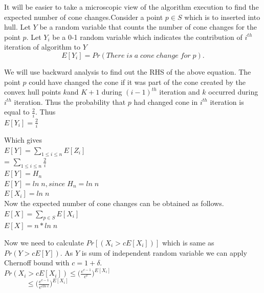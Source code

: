 \documentclass{assignment}
\begin{document}
\begin{problemlist}
\begin{problem}
\begin{enumerate}
\begin{answer}
It will be easier to take a microscopic view of the algorithm execution to find the
expected number of cone changes.Consider a point $p \in S$ which is to 
inserted into hull. Let $Y$ be a random variable that counts the number of cone
changes for the point $p$. Let $Y_i$ be a 0-1 random variable which 
indicates the contribution of $i^{th}$ iteration of algorithm to $Y$
\begin{equation}
E[Y_i ] = P r(There \; is \; a \; cone \; change \; for \; p).
\end{equation}

We will use backward analysis to find out the RHS of the above equation. The point
$p$ could have changed the cone if it was part of the cone created 
by the convex hull points $k$and $K+1$ during $(i-1)^{th}$ iteration and $k$
occurred during $i^{th}$ iteration. Thus the probability that $p$ had changed 
cone in $i^{th}$ iteration is equal to $\frac{2}{i}$. Thus\\

$E[Y_i]= \frac{2}{i}$

Which gives\\

$E[Y] = \sum_{1 \leq i \leq n} E[Z_i] $\\
  
= $\sum_{1 \leq i \leq n} \frac{2}{i}$\\

$E[Y]= H_n$\\

$E[Y]= ln \; n , since \; H_n = ln \; n $\\

$E[X_i]= ln \; n$\\

Now the expected number of cone changes can be obtained as follows.\\

$E[X]= \sum_{ p \in S} E[X_i]$\\

$E[X]= n * ln \; n$

Now we need to calculate $Pr [(X_i > cE[X_i])]$ which is same as $Pr(Y>cE[Y])$. As
$Y$ is sum of independent random variable we can apply 
Chernoff bound with $c = 1 + \delta $. \\

$Pr(X_i>cE[X_i]) \leq \Bigg(\frac{e^{c-1}}{c^c}\Bigg)^{E[X_i]}$\\

$\;\;\;\;\;\;\;\;\;\;\;\leq \Bigg(\frac{e^{c-1}}{e^{cln \; c}}\Bigg)^{E[X_i]}$\\


\end{answer}
\end{enumerate}
\end{problem}
\end{problemlist}
\end{document}
